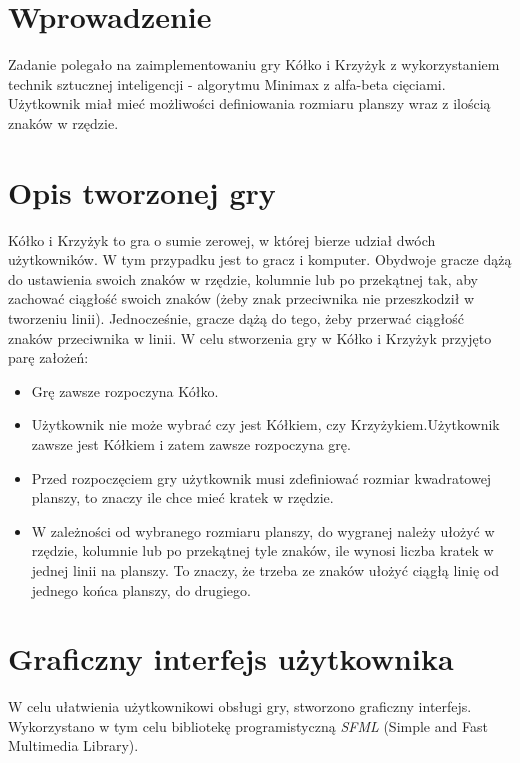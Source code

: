 \documentclass[12pt]{article}
\begin{document}
\renewcommand{\figurename}{Rys.}
\renewcommand{\tablename}{Tab.}
    

\tableofcontents
\newpage

\section{Wprowadzenie}
Zadanie polegało na zaimplementowaniu gry Kółko i Krzyżyk z wykorzystaniem technik sztucznej inteligencji - algorytmu Minimax z alfa-beta cięciami. Użytkownik miał mieć możliwości definiowania rozmiaru planszy wraz z ilością znaków w rzędzie. 

\section{Opis tworzonej gry}
Kółko i Krzyżyk to gra o sumie zerowej, w której bierze udział dwóch użytkowników. W tym przypadku jest to gracz i komputer. Obydwoje gracze dążą do ustawienia swoich znaków w rzędzie, kolumnie lub po przekątnej tak, aby zachować ciągłość swoich znaków (żeby znak przeciwnika nie przeszkodził w tworzeniu linii). Jednocześnie, gracze dążą do tego, żeby przerwać ciągłość znaków przeciwnika w linii. W celu stworzenia gry w Kółko i Krzyżyk przyjęto parę założeń:
\begin{itemize}
    \item Grę zawsze rozpoczyna Kółko.
    \item Użytkownik nie może wybrać czy jest Kółkiem, czy Krzyżykiem.Użytkownik zawsze jest Kółkiem i zatem zawsze rozpoczyna grę.
    \item Przed rozpoczęciem gry użytkownik musi zdefiniować rozmiar kwadratowej planszy, to znaczy ile chce mieć kratek w rzędzie.
    \item W zależności od wybranego rozmiaru planszy, do wygranej należy ułożyć w rzędzie, kolumnie lub po przekątnej tyle znaków, ile wynosi liczba kratek w jednej linii na planszy. To znaczy, że trzeba ze znaków ułożyć ciągłą linię od jednego końca planszy, do drugiego. 
\end{itemize}

\section{Graficzny interfejs użytkownika}
W celu ułatwienia użytkownikowi obsługi gry, stworzono graficzny interfejs. Wykorzystano w tym celu bibliotekę programistyczną \textit{SFML} (Simple and Fast Multimedia Library).
\end{document}
